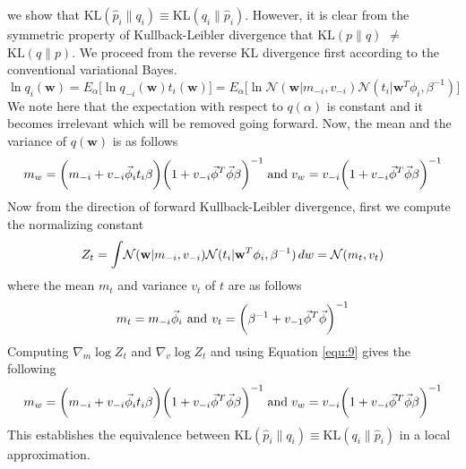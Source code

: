 \documentclass[]{article}
\begin{document}
we show that $\text{KL}(\hat{p}_i\|q_i) \equiv \text{KL}(q_i\|\hat{p}_i)$. However, it is clear from the symmetric property of Kullback-Leibler divergence that $\text{KL}(p\|q)$ $\not=$ $\text{KL}(q\|p)$. We proceed from the reverse $\text{KL}$ divergence first according to the conventional variational Bayes. 
\begin{equation}
	\ln q_i(\mathbf{w}) = E_\alpha\bigg[\ln q_{-i}(\mathbf{w})t_i(\mathbf{w})\bigg] = E_\alpha\bigg[\ln \mathcal{N}(\mathbf{w}|m_{-i},v_{-i})\mathcal{N}(t_i|\mathbf{w}^T\phi_i,\beta^{-1})\bigg] \label{equ:7}
\end{equation}
We note here that the expectation with respect to $q(\alpha)$ is constant and it becomes irrelevant which will be removed going forward. Now, the mean and the variance of $q(\mathbf{w})$ is as follows
\begin{equation}
	m_w = \bigg(m_{-i} + v_{-i}\vec{\phi}_it_i\beta\bigg)\bigg(1 + v_{-i}\vec{\phi}^T\vec{\phi}\beta\bigg)^{-1} \hspace{0.04in} \text{and} \hspace{0.04in} v_w = v_{-i}\bigg(1 + v_{-i}\vec{\phi}^T\vec{\phi}\beta\bigg)^{-1}
	\label{equ:8}
\end{equation} 
Now from the direction of forward Kullback-Leibler divergence, first we compute the normalizing constant
\begin{equation}
	Z_t = \mathlarger \int \mathcal{N}(\mathbf{w}|m_{-i},v_{-i})\mathcal{N}(t_i|\mathbf{w}^T\phi_i,\beta^{-1}) \hspace{0.02in} dw = \mathcal{N}(m_t, v_t)
	\label{equ:9}
\end{equation}
where the mean $m_t$ and variance $v_t$ of $t$ are as follows
\begin{equation}
	m_t = m_{-i} \vec{\phi}_i \hspace{0.05in} \text{and} \hspace{0.05in} v_t = \bigg(\beta^{-1} + v_{-1}\vec{\phi}^T\vec{\phi}\bigg)^{-1}
	\label{equ:10}
\end{equation} 
Computing $\nabla_m \log Z_t$ and $\nabla_v \log Z_t$ and using Equation \ref{equ:9} gives the following 
\begin{equation}
	m_w = \bigg(m_{-i} + v_{-i}\vec{\phi}_it_i\beta\bigg)\bigg(1 + v_{-i}\vec{\phi}^T\vec{\phi}\beta\bigg)^{-1} \hspace{0.04in} \text{and} \hspace{0.04in} v_w = v_{-i}\bigg(1 + v_{-i}\vec{\phi}^T\vec{\phi}\beta\bigg)^{-1}
	\label{equ:11}
\end{equation} 
This establishes the equivalence between $\text{KL}(\hat{p}_i\|q_i) \equiv \text{KL}(q_i\|\hat{p}_i)$ in a local approximation.
\end{document}
